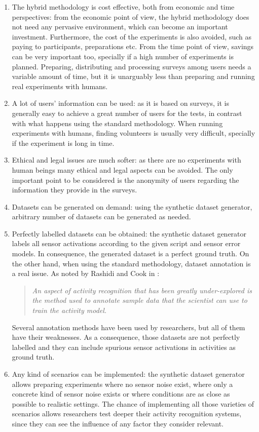 \begin{enumerate}
 \item The hybrid methodology is cost effective, both from economic and time perspectives: from the economic point of view, the hybrid methodology does not need any pervasive environment, which can become an important investment. Furthermore, the cost of the experiments is also avoided, such as paying to participants, preparations etc. From the time point of view, savings can be very important too, specially if a high number of experiments is planned. Preparing, distributing and processing surveys among users needs a variable amount of time, but it is unarguably less than preparing and running real experiments with humans. 
 \item A lot of users' information can be used: as it is based on surveys, it is generally easy to achieve a great number of users for the tests, in contrast with what happens using the standard methodology. When running experiments with humans, finding volunteers is usually very difficult, specially if the experiment is long in time. 
 \item Ethical and legal issues are much softer: as there are no experiments with human beings many ethical and legal aspects can be avoided. The only important point to be considered is the anonymity of users regarding the information they provide in the surveys.
 \item Datasets can be generated on demand: using the synthetic dataset generator, arbitrary number of datasets can be generated as needed.
 \item Perfectly labelled datasets can be obtained: the synthetic dataset generator labels all sensor activations according to the given script and sensor error models. In consequence, the generated dataset is a perfect ground truth. On the other hand, when using the standard methodology, dataset annotation is a real issue. As noted by Rashidi and Cook in \cite{Rashidi2011}: \blockquote{\textit{An aspect of activity recognition that has been greatly under-explored is the method used to annotate sample data that the scientist can use to train the activity model.}} Several annotation methods have been used by researchers, but all of them have their weaknesses. As a consequence, those datasets are not perfectly labelled and they can include spurious sensor activations in activities as ground truth.
 \item Any kind of scenarios can be implemented: the synthetic dataset generator allows preparing experiments where no sensor noise exist, where only a concrete kind of sensor noise exists or where conditions are as close as possible to realistic settings. The chance of implementing all those varieties of scenarios allows researchers test deeper their activity recognition systems, since they can see the influence of any factor they consider relevant. 
\end{enumerate}

